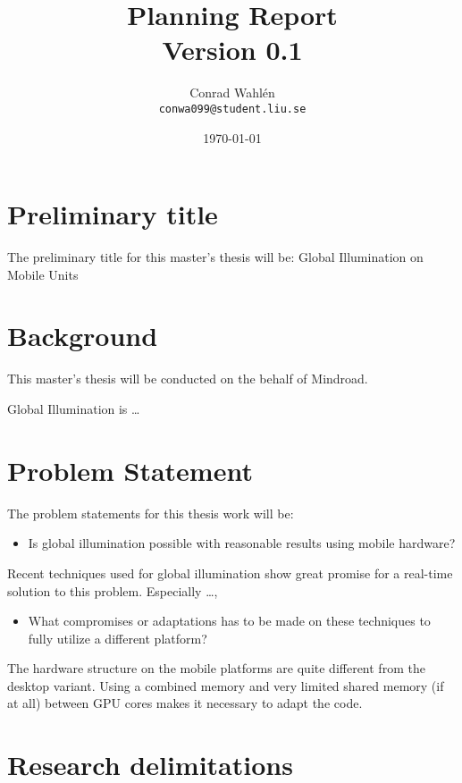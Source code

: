 \documentclass[a4paper, 12pt]{article}
\title{Planning Report \\ \small{Version 0.1}}
\author{Conrad Wahlén \\ \texttt{conwa099@student.liu.se}}
\date{\today}
\begin{document}
\maketitle
\thispagestyle{empty}
\newpage


\section{Preliminary title}
\label{sec:Preliminary title}

The preliminary title for this master's thesis will be:
Global Illumination on Mobile Units

\section{Background}
\label{sec:Background}

This master's thesis will be conducted on the behalf of Mindroad.

Global Illumination is \ldots

\section{Problem Statement}
\label{sec:Problem Statement}

The problem statements for this thesis work will be:

\begin{itemize}
  \item Is global illumination possible with reasonable results using mobile hardware?
\end{itemize}

Recent techniques used for global illumination show great promise for a real-time solution to this problem. Especially \ldots,

\begin{itemize}
  \item What compromises or adaptations has to be made on these techniques to fully utilize a different platform?
\end{itemize}

The hardware structure on the mobile platforms are quite different from the desktop variant. Using a combined memory and very limited shared memory (if at all) between GPU cores makes it necessary to adapt the code.

\section{Research delimitations}
\label{sec:Research delimitations}
\end{document}
